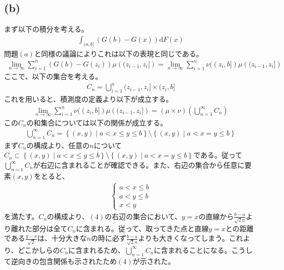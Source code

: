 \documentclass{article}
\begin{document}
\subsection{(b)}
まず以下の積分を考える。
\begin{align*}
	\int_{(a,b]} \left( G(b) - G(x) \right) \mathrm{d}F(x)
\end{align*}
問題$(a)$と同様の議論によりこれは以下の表現と同じである。
\begin{align*}
	\lim_{n \to \infty} \sum_{i = 1}^n \left( G(b) - G(z_i) \right) \mu\left( (z_{i-1}, z_i] \right) = \lim_{n \to \infty} \sum_{i = 1}^n \nu((z_i,b]) \mu\left( (z_{i-1}, z_i] \right)
\end{align*}
ここで、以下の集合を考える。
\begin{align*}
	C_n = \bigcup_{i = 1}^n (z_{i-1}, z_i] \times (z_i , b]
\end{align*}
これを用いると、積測度の定義より以下が成立する。
\begin{align*}
	\lim_{n \to \infty} \sum_{i = 1}^n \nu((z_i,b]) \mu\left( (z_{i-1}, z_i] \right) = (\mu \times \nu) \left( \bigcup_{n=1}^{\infty} C_n \right)
\end{align*}
この$C_n$の和集合については以下の関係が成立する。
\begin{align}
	\bigcup_{n=1}^{\infty} C_n = \left\{ (x, y) \mid a < x \leq y \leq b \right\} \setminus \left\{ (x, y) \mid a < x = y \leq b \right\}
\end{align}
まず$C_n$の構成より、任意の$n$について$C_n \subset  \left\{ (x, y) \mid a < x \leq y \leq b \right\} \setminus \left\{ (x, y) \mid a < x = y \leq b \right\}$である。従って$\bigcup_{n=1}^{\infty} C_n$が右辺に含まれることが確認できる。また、右辺の集合から任意に要素$(x, y)$をとると、
\begin{align*}
\begin{cases}
	a < x \leq b\\
	a < y \leq b\\
	x < y
\end{cases}
\end{align*}
を満たす。$C_n$の構成より、$(4)$の右辺の集合において、$y = x$の直線から$\frac{b-a}{\sqrt{2}n}$より離れた部分は全て$C_n$に含まれる。従って、取ってきた点と直線$y = x$との距離である$\frac{y-x}{\sqrt{2}}$は、十分大きな$n$の時に必ず$\frac{b-a}{\sqrt{2}n}$よりも大きくなってしまう。これより、どこかしらの$C_n$に含まれるため、$\bigcup_{n=1}^{\infty} C_n$に含まれることになる。こうして逆向きの包含関係も示されたため$(4)$が示された。
\end{document}
